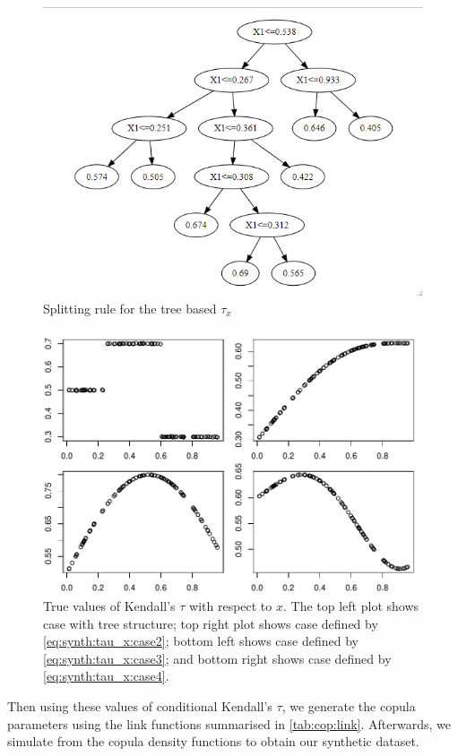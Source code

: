 \documentclass{amsart}
\begin{document}
\begin{figure}
    \centering
    \caption{Splitting rule for the tree based $\tau_x$}
    \label{fig:tau_tree_split}
    \includegraphics[width=0.5\linewidth]{tree_cond_tau_x.png}
\end{figure}

\begin{figure}
    \centering
    \includegraphics[width=0.95\linewidth]{true_tau.pdf}
    \caption{True values of Kendall's $\tau$ with respect to $x$. The top left plot shows case with tree structure; top right plot shows case defined by \cref{eq:synth:tau_x:case2}; bottom left shows case defined by \cref{eq:synth:tau_x:case3}; and bottom right shows case defined by \cref{eq:synth:tau_x:case4}.}
    \label{fig:true:tau}
\end{figure}

Then using these values of conditional Kendall's $\tau$, we generate the copula parameters using the link functions summarised in \cref{tab:cop:link}. Afterwards, we simulate from the copula density functions to obtain our synthetic dataset.
\end{document}
